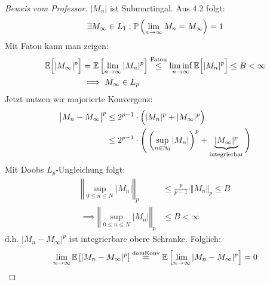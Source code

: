 \begin{proof}[Beweis vom Professor]\enter
	$|M_n|$ ist Submartingal. Aus 4.2 folgt:
	\begin{align*}
		\exists M_\infty\in L_1:\mathbb{P}\left(\lim\limits_{n\to\infty} M_n=M_\infty\right)=1
	\end{align*}
	Mit Fatou kann man zeigen:
	\begin{align*}
		\mathbb{E}\Big[|M_\infty|^p\Big]
		&=\mathbb{E}\left[\lim\limits_{n\to\infty} |M_n|^p\right]
		\overset{\text{Fatou}}{\leq}
		\liminf\limits_{n\to\infty}\mathbb{E}\Big[|M_n|^p\Big]\leq B<\infty\\
		&\implies M_\infty\in L_p
	\end{align*}
	Jetzt nutzen wir majorierte Konvergenz:
	\begin{align*}
		\big|M_n-M_\infty\big|^p
		&\leq
		2^{p-1}\cdot\Big(|M_n|^p+|M_\infty|^p\Big)\\
		&\leq 2^{p-1}\cdot\Bigg(\left(\sup\limits_{n\in\mathbb{N}_0}|M_n|\right)^p+\underbrace{|M_\infty|^p}_{\text{integrierbar}}\Bigg)
	\end{align*}
	Mit Doobs $L_p$-Ungleichung folgt:
	\begin{align*}
		\left\Vert\sup\limits_{0\leq n\leq N}|M_n|\right\Vert_p
		&\leq \frac{p}{p-1}\cdot\Vert M_n\Vert_p\leq B\\
		\implies
		\left\Vert\sup\limits_{0\leq n\leq N}|M_n|\right\Vert_p
		&\leq B<\infty
	\end{align*}
	d.h. $|M_n-M_\infty|^p$ ist integrierbare obere Schranke. Folglich:
	\begin{align*}
		\lim\limits_{n\to\infty}\mathbb{E}\left[|M_n-M_\infty|^p\right]	
		\overset{\text{domKonv}}=
		\mathbb{E}\left[\lim\limits_{n\to\infty}|M_n-M_\infty|^p\right]=0
	\end{align*}
\end{proof}


